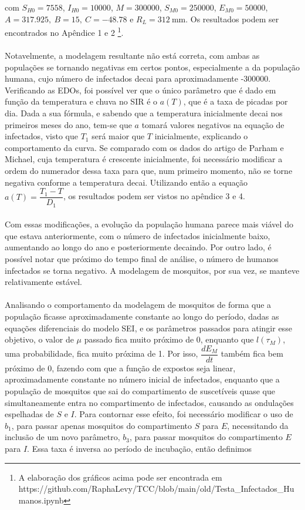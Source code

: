 com $S_{H0} = 7558$, $I_{H0} = 10000$, $M= 300000$, $S_{M0}=250000$, $E_{M0} = 50000$, $A = 317.925, \ B = 15, \ C = -48.78$ e $R_L = 312 \ \text{mm}$. 
Os resultados podem ser encontrados no Apêndice 1 e 2 \footnote{A elaboração dos gráficos acima pode ser encontrada em
\\
https://github.com/RaphaLevy/TCC/blob/main/old/Testa\_Infectados\_Humanos.ipynb}. 
\\\\
Notavelmente, a modelagem resultante não está correta, com ambas as populações se tornando negativas em certos pontos, especialmente a da população humana, cujo número de infectados decai para aproximadamente -300000. Verificando as EDOs, foi possível ver que o único parâmetro que é dado em função da temperatura e chuva no SIR é o $a(T)$, que é a taxa de picadas por dia. Dada a sua fórmula, e sabendo que a temperatura inicialmente decai nos primeiros meses do ano, tem-se que $a$ tomará valores negativos na equação de infectados, visto que $T_1$ será maior que $T$ inicialmente, explicando o comportamento da curva. Se comparado com os dados do artigo de Parham e Michael, cuja temperatura é crescente inicialmente, foi necessário modificar a ordem do numerador dessa taxa para que, num primeiro momento, não se torne negativa conforme a temperatura decai. Utilizando então a equação $a(T) = \dfrac{T_1-T}{D_1}$, os resultados podem ser vistos no apêndice 3 e 4.
\\\\
Com essas modificações, a evolução da população humana parece mais viável do que estava anteriormente, com o número de infectados inicialmente baixo, 
aumentando ao longo do ano e posteriormente decaindo. Por outro lado, é possível notar que próximo do tempo final de análise, o número de humanos 
infectados se torna negativo. A modelagem de mosquitos, por sua vez, se manteve relativamente estável.
\\\\
Analisando o comportamento da modelagem de mosquitos de forma que a população ficasse aproximadamente constante ao longo do período, dadas as equações diferenciais do modelo SEI, e os parâmetros passados para atingir esse objetivo, o valor de $\mu$ passado fica muito próximo de 0, enquanto que $l(\tau_M)$, uma probabilidade, fica muito próxima de 1. Por isso, $\dfrac{dE_M}{dt}$ também fica bem próximo de 0, fazendo com que a função de expostos seja linear, aproximadamente constante no número inicial de infectados, enquanto que a população de mosquitos que sai do compartimento de suscetíveis quase que simultaneamente entra no compartimento de infectados, causando as ondulações espelhadas de $S$ e $I$. Para contornar esse efeito, foi necessário modificar o uso de $b_1$, para passar apenas mosquitos do compartimento $S$ para $E$, necessitando da inclusão de um novo parâmetro, $b_3$, para passar mosquitos do compartimento $E$ para $I$. Essa taxa é inversa ao período de incubação, então definimos

